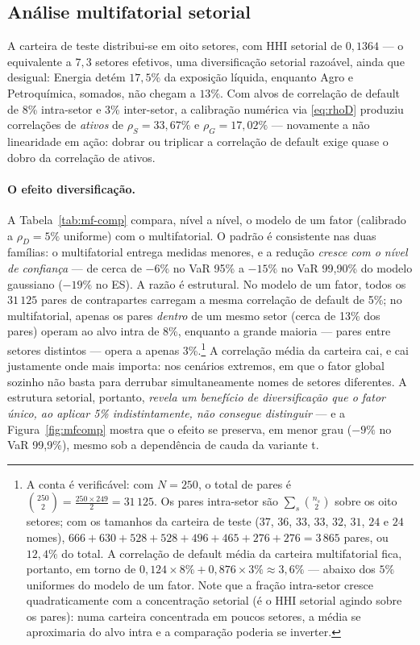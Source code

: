 \documentclass[11pt,a4paper]{article}
\begin{document}
\subsection{Análise multifatorial setorial}
\label{sec:mf-ex}

A carteira de teste distribui-se em oito setores, com HHI setorial de $0{,}1364$ --- o equivalente a $7{,}3$ setores efetivos, uma diversificação setorial razoável, ainda que desigual: Energia detém $17{,}5\%$ da exposição líquida, enquanto Agro e Petroquímica, somados, não chegam a $13\%$. Com alvos de correlação de default de 8\% intra-setor e 3\% inter-setor, a calibração numérica via \eqref{eq:rhoD} produziu correlações de \emph{ativos} de $\rho_S=33{,}67\%$ e $\rho_G=17{,}02\%$ --- novamente a não linearidade em ação: dobrar ou triplicar a correlação de default exige quase o dobro da correlação de ativos.

\paragraph{O efeito diversificação.} A Tabela~\ref{tab:mf-comp} compara, nível a nível, o modelo de um fator (calibrado a $\rho_D=5\%$ uniforme) com o multifatorial. O padrão é consistente nas duas famílias: o multifatorial entrega medidas menores, e a redução \emph{cresce com o nível de confiança} --- de cerca de $-6\%$ no VaR 95\% a $-15\%$ no VaR 99{,}90\% do modelo gaussiano ($-19\%$ no ES). A razão é estrutural. No modelo de um fator, todos os $31\,125$ pares de contrapartes carregam a mesma correlação de default de 5\%; no multifatorial, apenas os pares \emph{dentro} de um mesmo setor (cerca de 13\% dos pares) operam ao alvo intra de 8\%, enquanto a grande maioria --- pares entre setores distintos --- opera a apenas 3\%.\footnote{A conta é verificável: com $N=250$, o total de pares é $\binom{250}{2}=\frac{250\times249}{2}=31\,125$. Os pares intra-setor são $\sum_s\binom{n_s}{2}$ sobre os oito setores; com os tamanhos da carteira de teste ($37$, $36$, $33$, $33$, $32$, $31$, $24$ e $24$ nomes), $666+630+528+528+496+465+276+276=3\,865$ pares, ou $12{,}4\%$ do total. A correlação de default média da carteira multifatorial fica, portanto, em torno de $0{,}124\times8\%+0{,}876\times3\%\approx3{,}6\%$ --- abaixo dos $5\%$ uniformes do modelo de um fator. Note que a fração intra-setor cresce quadraticamente com a concentração setorial (é o HHI setorial agindo sobre os pares): numa carteira concentrada em poucos setores, a média se aproximaria do alvo intra e a comparação poderia se inverter.} A correlação média da carteira cai, e cai justamente onde mais importa: nos cenários extremos, em que o fator global sozinho não basta para derrubar simultaneamente nomes de setores diferentes. A estrutura setorial, portanto, \emph{revela um benefício de diversificação que o fator único, ao aplicar 5\% indistintamente, não consegue distinguir} --- e a Figura~\ref{fig:mfcomp} mostra que o efeito se preserva, em menor grau ($-9\%$ no VaR 99{,}9\%), mesmo sob a dependência de cauda da variante t.
\end{document}

